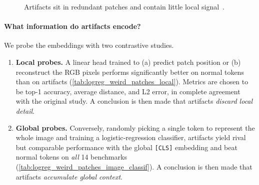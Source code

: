 \documentclass{article}
\newcommand{\citep}{\parencite}
\begin{document}
\begin{figure}[tb]
  \centering
  \hfill
  \caption{Artifacts sit in redundant patches and contain little local signal \citep{darcetVisionTransformersNeed2024}.}
\end{figure}

\paragraph{What information do artifacts encode?}
We probe the embeddings with two contrastive studies.
\begin{enumerate}
  \item \textbf{Local probes.} 
    A linear head trained to
    (a) predict patch position or 
    (b) reconstruct the RGB pixels performs significantly better on normal tokens than on artifacts (\cref{tab:logreg_weird_patches_local}).
    Metrics are chosen to be top-1 accuracy, average distance, and L2 error, in complete agreement with the original study.
    A conclusion is then made that artifacts \emph{discard local detail}.
  \item \textbf{Global probes.} 
    Conversely, randomly picking a single token to represent the whole image and training a logistic‑regression classifier, artifacts yield rival but comparable performance with the global \texttt{[CLS]} embedding and beat normal tokens on \emph{all} 14 benchmarks (\cref{tab:logreg_weird_patches_image_classif}).
    A conclusion is then made that artifacts \emph{accumulate global context}.
\end{enumerate}
\end{document}
